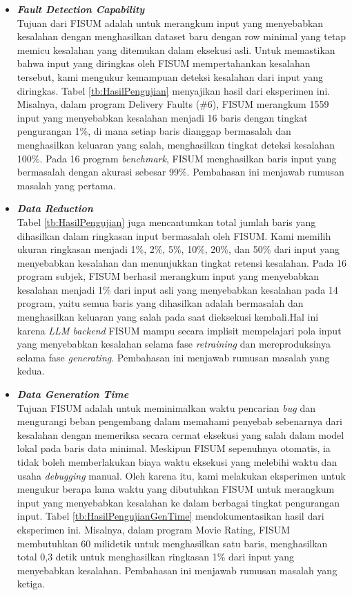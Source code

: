 \begin{itemize}
  \item \emph{\textbf{Fault Detection Capability}} \\
  Tujuan dari FISUM adalah untuk merangkum input yang 
  menyebabkan kesalahan dengan menghasilkan dataset baru 
  dengan row minimal yang tetap memicu 
  kesalahan yang ditemukan dalam 
  eksekusi asli. Untuk memastikan bahwa input yang 
  diringkas oleh FISUM mempertahankan kesalahan tersebut, 
  kami mengukur kemampuan deteksi kesalahan dari input 
  yang diringkas. Tabel \ref{tb:HasilPengujian} menyajikan 
  hasil dari eksperimen ini. 
  Misalnya, dalam program Delivery Faults (\#6), 
  FISUM merangkum 1559 input yang menyebabkan kesalahan 
  menjadi 16 baris dengan tingkat pengurangan 1\%, 
  di mana setiap baris dianggap bermasalah dan menghasilkan 
  keluaran yang salah, menghasilkan tingkat deteksi 
  kesalahan 100\%. Pada 16 program \emph{benchmark}, 
  FISUM menghasilkan baris input yang bermasalah dengan
  akurasi sebesar 99\%. Pembahasan ini menjawab 
  rumusan masalah yang pertama.

  \item \emph{\textbf{Data Reduction}} \\
  Tabel \ref{tb:HasilPengujian} juga mencantumkan total 
  jumlah baris yang dihasilkan dalam ringkasan input 
  bermasalah oleh FISUM. Kami memilih ukuran ringkasan 
  menjadi 1\%, 2\%, 5\%, 10\%, 20\%, dan 50\% dari 
  input yang menyebabkan kesalahan dan menunjukkan 
  tingkat retensi kesalahan. Pada 16 program subjek, 
  FISUM berhasil merangkum input yang menyebabkan 
  kesalahan menjadi 1\% dari input asli yang menyebabkan 
  kesalahan pada 14 program, yaitu semua baris yang 
  dihasilkan adalah bermasalah dan 
  menghasilkan keluaran yang salah pada saat dieksekusi
  kembali.Hal ini karena \emph{LLM backend} 
  FISUM mampu secara implisit mempelajari pola 
  input yang menyebabkan kesalahan 
  selama fase \emph{retraining} dan mereproduksinya selama 
  fase \emph{generating}. Pembahasan ini menjawab
  rumusan masalah yang kedua.
  
  \item \emph{\textbf{Data Generation Time}} \\
  Tujuan FISUM adalah untuk meminimalkan waktu 
  pencarian \emph{bug} dan mengurangi beban pengembang 
  dalam memahami penyebab sebenarnya dari kesalahan 
  dengan memeriksa secara cermat eksekusi yang salah 
  dalam model lokal pada baris data minimal. Meskipun FISUM 
  sepenuhnya otomatis, ia tidak boleh memberlakukan 
  biaya waktu eksekusi yang melebihi waktu dan usaha 
  \emph{debugging} manual. Oleh karena itu, kami melakukan 
  eksperimen untuk mengukur berapa lama waktu yang 
  dibutuhkan FISUM untuk merangkum input yang menyebabkan 
  kesalahan ke dalam berbagai tingkat pengurangan input. 
  Tabel \ref{tb:HasilPengujianGenTime}
  mendokumentasikan hasil dari eksperimen ini. 
  Misalnya, dalam program Movie Rating, FISUM 
  membutuhkan 60 milidetik untuk menghasilkan satu baris, 
  menghasilkan total 0,3 detik untuk menghasilkan 
  ringkasan 1\% dari input yang menyebabkan kesalahan.
  Pembahasan ini menjawab rumusan masalah yang ketiga.
  

\end{itemize}
